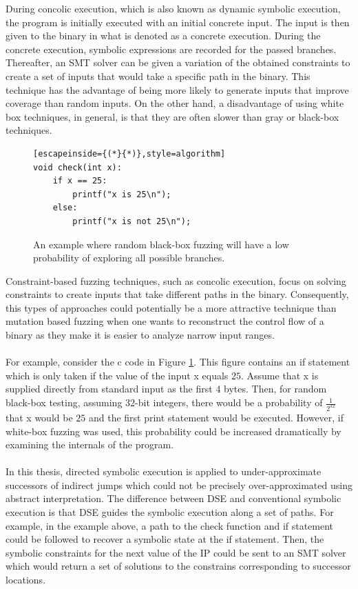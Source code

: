 \documentclass{kththesis}
\begin{document}
During concolic execution, which is also known as dynamic symbolic execution, the program is initially executed with an initial concrete input. The input is then given to the binary in what is denoted as a concrete execution. During the concrete execution, symbolic expressions are recorded for the passed branches. Thereafter, an SMT solver can be given a variation of the obtained constraints to create a set of inputs that would take a specific path in the binary. This technique has the advantage of being more likely to generate inputs that improve coverage than random inputs\cite{fuzzingSurvey}. On the other hand, a disadvantage of using white box techniques, in general, is that they are often slower than gray or black-box techniques\cite{fuzzingSurvey}.
\begin{figure}[!t]
    \centering
\begin{algorithmFrame}
\begin{lstlisting}[escapeinside={(*}{*)},style=algorithm]
void check(int x):
    if x == 25:
        printf("x is 25\n");
    else:
        printf("x is not 25\n");
\end{lstlisting}
\end{algorithmFrame}
\caption{An example where random black-box fuzzing will have a low probability of exploring all possible branches.}
    \label{fig:if25}
\end{figure}
\clearpage
\noindent
Constraint-based fuzzing techniques, such as concolic execution, focus on solving constraints to create inputs that take different paths in the binary. Consequently, this types of approaches could potentially be a more attractive technique than mutation based fuzzing when one wants to reconstruct the control flow of a binary as they make it is easier to analyze narrow input ranges.
\\ \\
For example, consider the c code in Figure \ref{fig:if25}. This figure contains an if statement which is only taken if the value of the input x equals $25$. Assume that x is supplied directly from standard input as the first 4 bytes. Then, for random black-box testing, assuming 32-bit integers, there would be a probability of $\frac{1}{2^{32}}$ that x would be $25$ and the first print statement would be executed. However, if white-box fuzzing was used, this probability could be increased dramatically by examining the internals of the program.
\\ \\
In this thesis, directed symbolic execution is applied to under-approximate successors of indirect jumps which could not be precisely over-approximated using abstract interpretation. The difference between DSE and conventional symbolic execution is that DSE guides the symbolic execution along a set of paths. For example, in the example above, a path to the check function and if statement could be followed to recover a symbolic state at the if statement. Then, the symbolic constraints for the next value of the IP could be sent to an SMT solver which would return a set of solutions to the constrains corresponding to successor locations.
\end{document}
